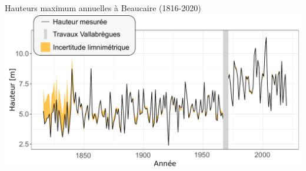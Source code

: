 \documentclass[compress,9pt]{beamer}
\begin{document}
\begin{frame}
\begin{minipage}{0.2\textwidth}
		\end{minipage}
		\hfill
		\begin{minipage}{0.78\textwidth}
			\centering
			Hauteurs maximum annuelles à Beaucaire (1816-2020)
			\vfill
			\includegraphics[width = \textwidth]{./Figures/Stage.pdf} 
		\end{minipage}
	\end{frame}	
	
\end{document}
